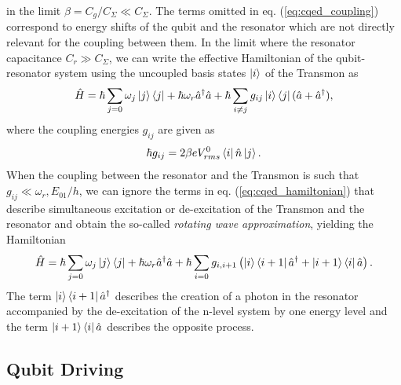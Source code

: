 %
in the limit $\beta = C_g/C_\Sigma \ll C_\Sigma$. The terms omitted in eq. (\ref{eq:cqed_coupling}) correspond to energy shifts of the qubit and the resonator which are not directly relevant for the coupling between them. 
 In the limit where the resonator capacitance $C_r \gg C_\Sigma$, we can write the effective Hamiltonian of the qubit-resonator system using the uncoupled basis states $\left| i \right>$ of the Transmon as
%
\begin{equation}
\hat{H} = \hbar \sum\limits_{j=0} \omega_j \left| j \right>\left< j \right| + \hbar \omega_r \hat{a}^\dagger \hat{a} + \hbar \sum\limits_{i\ne j} g_{ij} \left| i \right>\left< j \right|(\hat{a}+\hat{a}^\dagger), \label{eq:cqed_hamiltonian}
\end{equation}
%
where the coupling energies $g_{ij}$ are given as
%
\begin{equation}
\hbar g_{ij} = 2\beta e V_{rms}^0 \left< i \right|\hat{n}\left| j \right>. \label{eq:qubit_bus_coupling}
\end{equation}
%
When the coupling between the resonator and the Transmon is such that $g_{ij} \ll \omega_r,E_{01}/h$, we can ignore the terms in eq. (\ref{eq:cqed_hamiltonian}) that describe simultaneous excitation or de-excitation of the Transmon and the resonator and obtain the so-called {\it rotating wave approximation}, yielding the Hamiltonian
%
\begin{equation}
\hat{H} = \hbar \sum\limits_{j=0} \omega_j \left| j \right>\left< j \right|+\hbar \omega_r \hat{a}^\dagger \hat{a} + \hbar \sum\limits_{i=0} g_{i,i+1}\left(\left| i \right>\left< i+1 \right|\hat{a}^\dagger +\left| i+1 \right>\left< i \right|\hat{a}\right). \label{eq:cqed_rotating_wave}
\end{equation}
%
The term $\left| i \right>\left< i+1 \right|\hat{a}^\dagger$ describes the creation of a photon in the resonator accompanied by the de-excitation of the n-level system by one energy level and the term $\left| i+1 \right>\left< i \right|\hat{a}$ describes the opposite process.

\subsection{Qubit Driving}

